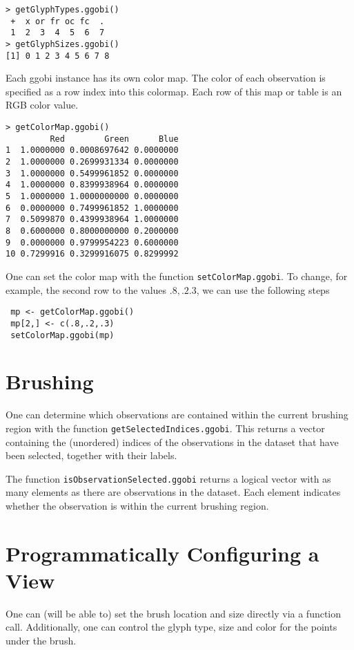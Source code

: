 \documentclass{article}
\def\SFunction#1{{\texttt{\red #1}}}
\begin{document}
\begin{verbatim}
> getGlyphTypes.ggobi()
 +  x or fr oc fc  . 
 1  2  3  4  5  6  7 
> getGlyphSizes.ggobi()
[1] 0 1 2 3 4 5 6 7 8
\end{verbatim}

Each ggobi instance has its own color map.  The color of each
observation is specified as a row index into this colormap.  Each row
of this map or table is an RGB color value.

\begin{verbatim}
> getColorMap.ggobi()
         Red        Green      Blue
1  1.0000000 0.0008697642 0.0000000
2  1.0000000 0.2699931334 0.0000000
3  1.0000000 0.5499961852 0.0000000
4  1.0000000 0.8399938964 0.0000000
5  1.0000000 1.0000000000 0.0000000
6  0.0000000 0.7499961852 1.0000000
7  0.5099870 0.4399938964 1.0000000
8  0.6000000 0.8000000000 0.2000000
9  0.0000000 0.9799954223 0.6000000
10 0.7299916 0.3299916075 0.8299992
\end{verbatim}

One can set the color map with the function
\SFunction{setColorMap.ggobi}.  To change, for example, the second row
to the values $.8, .2. 3$, we can use the following steps
\begin{verbatim}
 mp <- getColorMap.ggobi()
 mp[2,] <- c(.8,.2,.3)
 setColorMap.ggobi(mp)
\end{verbatim}



\section{Brushing}
One can determine which observations are contained within the current
brushing region with the function
\SFunction{getSelectedIndices.ggobi}.  This returns a vector
containing the (unordered) indices of the observations in the dataset
that have been selected, together with their labels.

The function \SFunction{isObservationSelected.ggobi} returns a logical
vector with as many elements as there are observations in the dataset.
Each element indicates whether the observation is within the current
brushing region.




\section{Programmatically Configuring a View} 
One can (will be able to) set the brush location and size directly via
a function call.  Additionally, one can control the glyph type, size
and color for the points under the brush.
\end{document}

